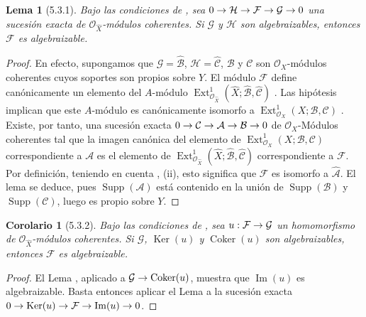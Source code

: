\documentclass[10pt,oneside,openany]{book}
\theoremstyle{egaenv}\newtheorem*{env}{---}
\theoremstyle{egastatement}
\newtheorem*{lemma}{Lema}
\newtheorem*{corollary}{Corolario}
\theoremstyle{egadescription}
\renewcommand{\to}{\mathchoice{\longrightarrow}{\rightarrow}{\rightarrow}{\rightarrow}}
\begin{document}
\begin{lemma}[5.3.1]
\label{III.5.3.1}
\label{III.5.3.1-fr}
Bajo las condiciones de , sea
$0\to\mathcal H\to\mathcal F\to\mathcal G\to0$
una sucesión exacta de $\mathcal O_{\widehat X}$-módulos coherentes.
Si $\mathcal G$ y $\mathcal H$ son algebraizables, entonces $\mathcal F$ es
algebraizable.
\end{lemma}

\begin{proof}
En efecto, supongamos que $\mathcal G=\widehat{\mathcal B}$,
$\mathcal H=\widehat{\mathcal C}$, $\mathcal B$ y $\mathcal C$ son $\mathcal O_X$-módulos coherentes cuyos
soportes son propios sobre $Y$. El módulo $\mathcal F$ define canónicamente
un elemento del $A$-módulo
$\operatorname{Ext}^1_{\mathcal O_{\widehat X}}
(\widehat X;\widehat{\mathcal B},\widehat{\mathcal C})$
. Las hipótesis implican que este $A$-módulo es
canónicamente isomorfo a
$\operatorname{Ext}^1_{\mathcal O_X}(X;\mathcal B,\mathcal C)$
. Existe, por tanto, una sucesión exacta
$0\to\mathcal C\to\mathcal A\to\mathcal B\to0$
de $\mathcal O_X$-Módulos
coherentes tal que la imagen canónica del elemento de
$\operatorname{Ext}^1_{\mathcal O_X}(X;\mathcal B,\mathcal C)$ correspondiente a
$\mathcal A$ es el elemento de
$\operatorname{Ext}^1_{\mathcal O_{\widehat X}}
(\widehat X;\widehat{\mathcal B},\widehat{\mathcal C})$ correspondiente a
$\mathcal F$. Por definición, teniendo en cuenta
, (ii), esto significa que $\mathcal F$ es isomorfo a
$\widehat{\mathcal A}$. El lema se deduce, pues
$\operatorname{Supp}(\mathcal A)$ está contenido en la unión de
$\operatorname{Supp}(\mathcal B)$ y $\operatorname{Supp}(\mathcal C)$, luego es
propio sobre $Y$.
\end{proof}

\begin{corollary}[5.3.2]
\label{III.5.3.2}
\label{III.5.3.2-fr}
Bajo las condiciones de , sea
$u:\mathcal F\to\mathcal G$ un homomorfismo de
$\mathcal O_{\widehat X}$-módulos coherentes. Si $\mathcal G$, $\operatorname{Ker}(u)$ y
$\operatorname{Coker}(u)$ son algebraizables, entonces $\mathcal F$ es algebraizable.
\end{corollary}

\begin{proof}
El Lema , aplicado a
$\mathcal G\to\operatorname{Coker}(u)$, muestra que $\operatorname{Im}(u)$ es algebraizable. Basta entonces
aplicar el Lema  a la sucesión exacta
$0\to\operatorname{Ker}(u)\to\mathcal F\to\operatorname{Im}(u)\to0$.
\end{proof}
\end{document}
